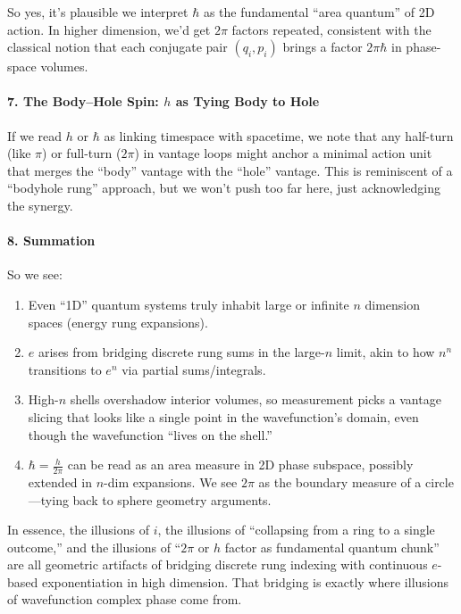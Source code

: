 \documentclass{article}
\begin{document}
So yes, it’s plausible we interpret $\hbar$ as the fundamental “area quantum” of 2D action. In higher dimension, we’d get $2\pi$ factors repeated, consistent with the classical notion that each conjugate pair $(q_i,p_i)$ brings a factor $2\pi\hbar$ in phase-space volumes.

\paragraph{7. The Body–Hole Spin: $h$ as Tying Body to Hole}

If we read $h$ or $\hbar$ as linking timespace with spacetime, we note that any half-turn (like $\pi$) or full-turn ($2\pi$) in vantage loops might anchor a minimal action unit that merges the “body” vantage with the “hole” vantage. This is reminiscent of a “bodyhole rung” approach, but we won’t push too far here, just acknowledging the synergy.

\paragraph{8. Summation}

So we see:
\begin{enumerate}
\item Even “1D” quantum systems truly inhabit large or infinite $n$ dimension spaces (energy rung expansions).\vspace{-6pt}
\item $e$ arises from bridging discrete rung sums in the large-$n$ limit, akin to how $n^n$ transitions to $e^n$ via partial sums/integrals.\vspace{-6pt}
\item High-$n$ shells overshadow interior volumes, so measurement picks a vantage slicing that looks like a single point in the wavefunction’s domain, even though the wavefunction “lives on the shell.”\vspace{-6pt}
\item $\hbar=\frac{h}{2\pi}$ can be read as an area measure in 2D phase subspace, possibly extended in $n$-dim expansions. We see $2\pi$ as the boundary measure of a circle—tying back to sphere geometry arguments.
\end{enumerate}

In essence, the illusions of $i$, the illusions of “collapsing from a ring to a single outcome,” and the illusions of “$2\pi$ or $h$ factor as fundamental quantum chunk” are all geometric artifacts of bridging discrete rung indexing with continuous $e$-based exponentiation in high dimension. That bridging is exactly where illusions of wavefunction complex phase come from.
\end{document}
